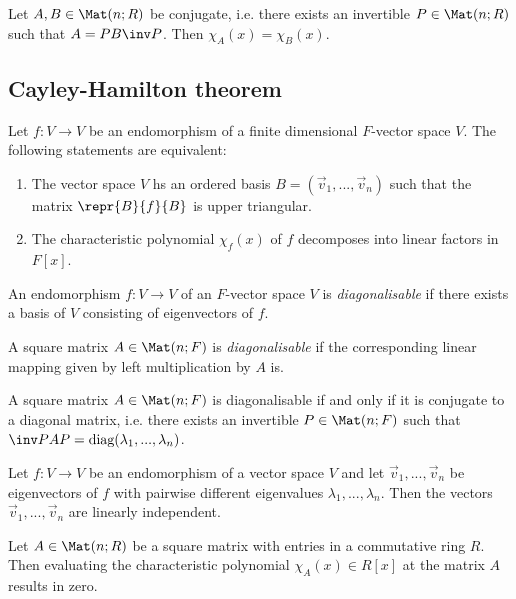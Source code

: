\documentclass{article}
\begin{document}
\begin{lemma}
    Let $A,B\in\Mat(n; R)$ be conjugate, i.e. there exists an invertible $P\in\Mat(n; R)$ such that 
    $A=PB\inv P$. Then $\chi_A(x)=\chi_B(x)$.
\end{lemma}

\subsection{Cayley-Hamilton theorem}

\begin{proposition}
    Let $f:V\to V$ be an endomorphism of a finite dimensional $F$-vector space $V$. The following 
    statements are equivalent:
    \begin{enumerate}
        \item The vector space $V$ hs an ordered basis $B=(\vec v_1,...,\vec v_n)$ such that the matrix 
            $\repr{B}{f}{B}$ is upper triangular.
        \item The characteristic polynomial $\chi_f(x)$ of $f$ decomposes into linear factors in $F[x]$.
    \end{enumerate}
\end{proposition}

\begin{definition}
    An endomorphism $f:V\to V$ of an $F$-vector space $V$ is \emph{diagonalisable} if there exists 
    a basis of $V$ consisting of eigenvectors of $f$.

    A square matrix $A\in\Mat(n;F)$ is \emph{diagonalisable} if the corresponding linear mapping 
    given by left multiplication by $A$ is.
\end{definition}

\begin{theorem}
    A square matrix $A\in\Mat(n;F)$ is diagonalisable if and only if it is conjugate to a diagonal
    matrix, i.e. there exists an invertible $P\in\Mat(n;F)$ such that 
    $\inv PAP=\text{diag}(\lambda_1,...,\lambda_n)$.
\end{theorem}

\begin{lemma}[Notes 4.6.9]
    Let $f:V\to V$ be an endomorphism of a vector space $V$ and let $\vec v_1,...,\vec v_n$ be 
    eigenvectors of $f$ with pairwise different eigenvalues $\lambda_1,...,\lambda_n$. Then 
    the vectors $\vec v_1,...,\vec v_n$ are linearly independent. 
\end{lemma}

\begin{theorem}
    Let $A\in\Mat(n;R)$ be a square matrix with entries in a commutative ring $R$. Then evaluating the 
    characteristic polynomial $\chi_A(x)\in R[x]$ at the matrix $A$ results in zero. 
\end{theorem}
\end{document}
